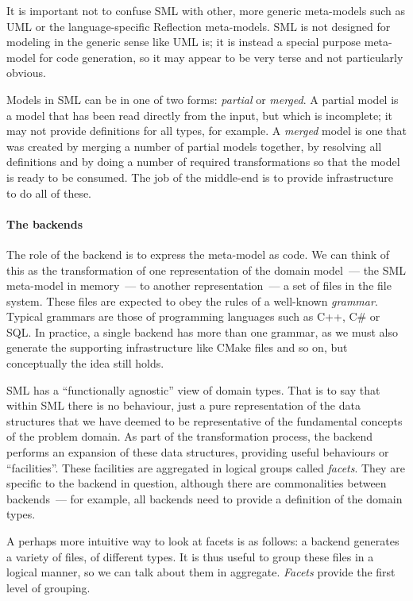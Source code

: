 \documentclass{book}
\begin{document}
It is important not to confuse SML with other, more generic
meta-models such as UML or the language-specific Reflection
meta-models. SML is not designed for modeling in the generic sense
like UML is; it is instead a special purpose meta-model for code
generation, so it may appear to be very terse and not particularly
obvious.

Models in SML can be in one of two forms: \emph{partial} or
\emph{merged}. A partial model is a model that has been read directly
from the input, but which is incomplete; it may not provide
definitions for all types, for example. A \emph{merged} model is one
that was created by merging a number of partial models together, by
resolving all definitions and by doing a number of required
transformations so that the model is ready to be consumed. The job of
the middle-end is to provide infrastructure to do all of these.

\paragraph{The backends}

The role of the backend is to express the meta-model as code. We can
think of this as the transformation of one representation of the
domain model~--- the SML meta-model in memory~--- to another
representation~--- a set of files in the file system. These files are
expected to obey the rules of a well-known \emph{grammar}. Typical
grammars are those of programming languages such as C++, C\# or
SQL. In practice, a single backend has more than one grammar, as we
must also generate the supporting infrastructure like CMake files and
so on, but conceptually the idea still holds.

SML has a ``functionally agnostic'' view of domain types. That is to
say that within SML there is no behaviour, just a pure representation
of the data structures that we have deemed to be representative of the
fundamental concepts of the problem domain. As part of the
transformation process, the backend performs an expansion of these
data structures, providing useful behaviours or ``facilities''. These
facilities are aggregated in logical groups called \emph{facets}. They
are specific to the backend in question, although there are
commonalities between backends~--- for example, all backends need to
provide a definition of the domain types.

A perhaps more intuitive way to look at facets is as follows: a
backend generates a variety of files, of different types. It is thus
useful to group these files in a logical manner, so we can talk about
them in aggregate. \emph{Facets} provide the first level of grouping.
\end{document}
